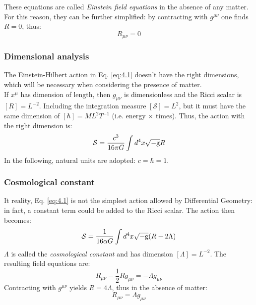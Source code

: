These equations are called \textit{Einstein field equations} in the absence of any matter. For this reason, they can be further simplified: by contracting with $ g^{\mu \nu} $ one finds $ R = 0 $, thus:
\begin{equation}
  R_{\mu \nu} = 0
  \label{eq:4.6}
\end{equation}

\subsubsection{Dimensional analysis}

The Einstein-Hilbert action in Eq. \ref{eq:4.1} doesn't have the right dimensions, which will be necessary when considering the presence of matter.\\
If $ x^\mu $ has dimension of length, then $ g_{\mu \nu} $ is dimensionless and the Ricci scalar is $ [R] = L^{-2} $. Including the integration measure $ [\mathcal{S}] = L^2 $, but it must have the same dimension of $ [\hbar] =  M L^2 T^{-1} $ (i.e. energy $ \times $ times). Thus, the action with the right dimension is:
\begin{equation}
  \mathcal{S} = \frac{c^3}{16 \pi G} \int d^4 x \sqrt{-\mathrm{g}} R
  \label{eq:4.7}
\end{equation}
In the following, natural units are adopted: $ c = \hbar = 1 $.

\subsubsection{Cosmological constant}

It reality, Eq. \ref{eq:4.1} is not the simplest action allowed by Differential Geometry: in fact, a constant term could be added to the Ricci scalar. The action then becomes:
\begin{equation}
  \mathcal{S} = \frac{1}{16 \alpha G} \int d^4 x \sqrt{-\mathrm{g}} (R - 2 \Lambda)
  \label{eq:4.8}
\end{equation}
$ \Lambda $ is called the \textit{cosmological constant} and has dimension $ [\Lambda] = L^{-2} $. The resulting field equations are:
\begin{equation}
  R_{\mu \nu} - \frac{1}{2} R g_{\mu \nu} = - \Lambda g_{\mu \nu}
  \label{eq:4.9}
\end{equation}
Contracting with $ g^{\mu \nu} $ yields $ R = 4\Lambda $, thus in the absence of matter:
\begin{equation}
  R_{\mu \nu} = \Lambda g_{\mu \nu}
  \label{eq:4.10}
\end{equation}

